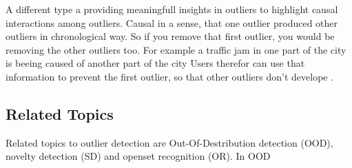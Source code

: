 A different type a providing meaningfull insights in outliers to highlight causal interactions among outliers. 
Causal in a sense, that one outlier produced other outliers in chronological way.
So if you remove that first outlier, you would be removing the other outliers too.
For example a traffic jam in one part of the city is beeing caused of another part of the city
Users therefor can use that information to prevent the first outlier, so that other outliers don't develope \citep{panjei2022survey}.

\subsection{Related Topics}
Related topics to outlier detection are Out-Of-Destribution detection (OOD), novelty detection (SD) and openset recognition (OR).
In OOD 